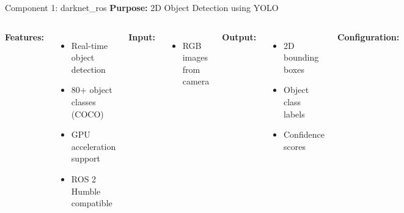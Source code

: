\documentclass[aspectratio=169]{beamer}
\begin{document}
\begin{frame}{Component 1: darknet\_ros}
\textbf{Purpose:} 2D Object Detection using YOLO

\begin{columns}
\textbf{Features:}
\begin{itemize}
    \item Real-time object detection
    \item 80+ object classes (COCO)
    \item GPU acceleration support
    \item ROS 2 Humble compatible
\end{itemize}

\vspace{0.5em}
\textbf{Input:}
\begin{itemize}
    \item RGB images from camera
\end{itemize}

\vspace{0.5em}
\textbf{Output:}
\begin{itemize}
    \item 2D bounding boxes
    \item Object class labels
    \item Confidence scores
\end{itemize}

\textbf{Configuration:}

\end{columns}
\end{frame}
\end{document}
